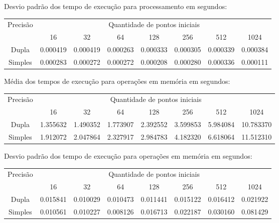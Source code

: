   \newpage
  \noindent Desvio padrão dos tempo de execução para processamento em segundos:\\
  \begin{scriptsize}
  \begin{tabular}{| c | c | c | c | c | c | c | c |}
    \hline
    \multirow{2}{*}{Precisão}& \multicolumn{7}{|c|}{Quantidade de pontos iniciais} \\ \cline{2-8}
    & 16 & 32 & 64 & 128 & 256 & 512 & 1024\\ \hline
    Dupla & 0.000419 & 0.000419 & 0.000263 & 0.000333 & 0.000305 & 0.000339 & 0.000384\\ \hline
    Simples & 0.000283 & 0.000272 & 0.000272 & 0.000208 & 0.000280 & 0.000336 & 0.000111\\ \hline

    \hline
  \end{tabular}
  \end{scriptsize}
  
  \hspace{1mm}\newline
  
  \noindent Média dos tempos de execução para operações em memória em segundos:\\
  \begin{scriptsize}
  \begin{tabular}{| c | c | c | c | c | c | c | c |}
    \hline
    \multirow{2}{*}{Precisão}& \multicolumn{7}{|c|}{Quantidade de pontos iniciais} \\ \cline{2-8}
    & 16 & 32 & 64 & 128 & 256 & 512 & 1024 \\ \hline
    Dupla & 1.355632 & 1.490352 & 1.773907 & 2.392552 & 3.599853 & 5.984084 & 10.783370\\ \hline
    Simples & 1.912072 & 2.047864 & 2.327917 & 2.984783 & 4.182320 & 6.618064 & 11.512310 \\ \hline
  \end{tabular}
  \end{scriptsize}
  
  \hspace{1mm}\newline
  
  \noindent Desvio padrão dos tempo de execução para operações em memória em segundos:\\
  \begin{scriptsize}
  \begin{tabular}{| c | c | c | c | c | c | c | c |}
    \hline
    \multirow{2}{*}{Precisão}& \multicolumn{7}{|c|}{Quantidade de pontos iniciais} \\ \cline{2-8}
    & 16 & 32 & 64 & 128 & 256 & 512 & 1024\\ \hline
    Dupla & 0.015841 & 0.010029 & 0.010473 & 0.011441 & 0.015122 & 0.016412 & 0.021922\\ \hline
    Simples & 0.010561 & 0.010227 & 0.008126 & 0.016713 & 0.022187 & 0.030160 & 0.081429\\ \hline
  \end{tabular}
  \end{scriptsize}
  
